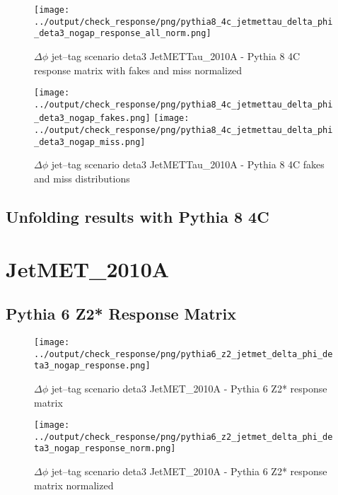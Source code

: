 \documentclass[11pt]{book}
\begin{document}
\begin{figure}[ht]
\centering
\texttt{[image: ../output/check\_response/png/pythia8\_4c\_jetmettau\_delta\_phi\_deta3\_nogap\_response\_all\_norm.png]}
\caption{$\Delta\phi$ jet--tag scenario deta3 JetMETTau\_2010A - Pythia 8 4C response matrix with fakes and miss normalized}
\label{p8_jetmettau_delta_phi_deta3_nogap_response_all_norm}
\end{figure}

\begin{figure}[ht]
\centering
\texttt{[image: ../output/check\_response/png/pythia8\_4c\_jetmettau\_delta\_phi\_deta3\_nogap\_fakes.png]}
\texttt{[image: ../output/check\_response/png/pythia8\_4c\_jetmettau\_delta\_phi\_deta3\_nogap\_miss.png]}
\caption{$\Delta\phi$ jet--tag scenario deta3 JetMETTau\_2010A - Pythia 8 4C fakes and miss distributions}
\label{p8_jetmettau_delta_phi_deta3_nogap_fakesmiss}
\end{figure}


\clearpage
\subsection{Unfolding results with Pythia 8 4C}


\section{JetMET\_2010A}
\subsection{Pythia 6 Z2* Response Matrix}

\begin{figure}[ht]
\centering
\texttt{[image: ../output/check\_response/png/pythia6\_z2\_jetmet\_delta\_phi\_deta3\_nogap\_response.png]}
\caption{$\Delta\phi$ jet--tag scenario deta3 JetMET\_2010A - Pythia 6 Z2* response matrix}
\label{p6_jetmet_delta_phi_deta3_nogap_response}
\end{figure}

\begin{figure}[ht]
\centering
\texttt{[image: ../output/check\_response/png/pythia6\_z2\_jetmet\_delta\_phi\_deta3\_nogap\_response\_norm.png]}
\caption{$\Delta\phi$ jet--tag scenario deta3 JetMET\_2010A - Pythia 6 Z2* response matrix normalized}
\label{p6_jetmet_delta_phi_deta3_nogap_response_norm}
\end{figure}
\end{document}
